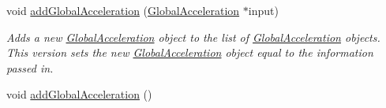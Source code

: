 \begin{DoxyCompactItemize}
void \hyperlink{classosea_1_1ofreq_1_1_outputs_body_aa726a0eca1105d15bd23fd1cb51ecc67}{add\-Global\-Acceleration} (\hyperlink{classosea_1_1ofreq_1_1_global_acceleration}{Global\-Acceleration} $\ast$input)
\begin{DoxyCompactList}\small\item\em Adds a new \hyperlink{classosea_1_1ofreq_1_1_global_acceleration}{Global\-Acceleration} object to the list of \hyperlink{classosea_1_1ofreq_1_1_global_acceleration}{Global\-Acceleration} objects. This version sets the new \hyperlink{classosea_1_1ofreq_1_1_global_acceleration}{Global\-Acceleration} object equal to the information passed in. \end{DoxyCompactList}\item 
\hypertarget{classosea_1_1ofreq_1_1_outputs_body_a3205155873f5db270a71377e5ff80bb4}{void \hyperlink{classosea_1_1ofreq_1_1_outputs_body_a3205155873f5db270a71377e5ff80bb4}{add\-Global\-Acceleration} ()}\label{classosea_1_1ofreq_1_1_outputs_body_a3205155873f5db270a71377e5ff80bb4}


\end{DoxyCompactItemize}

